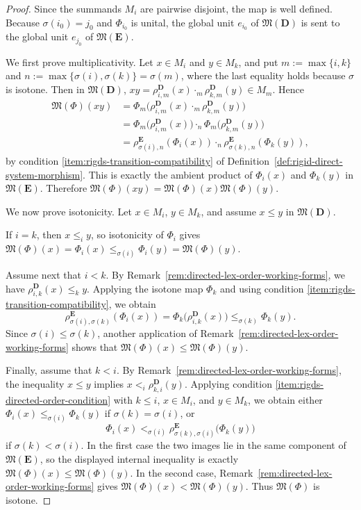 \documentclass[pdflatex,sn-mathphys-num]{sn-jnl}
\theoremstyle{thmstyleone}%
\theoremstyle{thmstyletwo}%
\theoremstyle{thmstylethree}%
\begin{document}
\begin{proof}
Since the summands \(M_i\) are pairwise disjoint, the map is well defined.
Because \(\sigma(i_0)=j_0\) and \(\Phi_{i_0}\) is unital, the global unit \(e_{i_0}\) of \(\mathfrak M(\mathbf D)\) is sent to the global unit \(e_{j_0}\) of \(\mathfrak M(\mathbf E)\).

We first prove multiplicativity.
Let \(x\in M_i\) and \(y\in M_k\), and put \(m:=\max\{i,k\}\) and \(n:=\max\{\sigma(i),\sigma(k)\}=\sigma(m)\), where the last equality holds because \(\sigma\) is isotone.
Then in \(\mathfrak M(\mathbf D)\), \(xy=\rho^{\mathbf D}_{i,m}(x)\cdot_m \rho^{\mathbf D}_{k,m}(y)\in M_m\).
Hence
\begin{align*}
\mathfrak M(\Phi)(xy)
&=\Phi_m\bigl(\rho^{\mathbf D}_{i,m}(x)\cdot_m
\rho^{\mathbf D}_{k,m}(y)\bigr)\\
&=\Phi_m\bigl(\rho^{\mathbf D}_{i,m}(x)\bigr)\cdot_n
\Phi_m\bigl(\rho^{\mathbf D}_{k,m}(y)\bigr)\\
&=\rho^{\mathbf E}_{\sigma(i),n}(\Phi_i(x))\cdot_n
\rho^{\mathbf E}_{\sigma(k),n}(\Phi_k(y)),
\end{align*}
by condition \ref{item:rigds-transition-compatibility} of Definition~\ref{def:rigid-direct-system-morphism}.
This is exactly the ambient product of \(\Phi_i(x)\) and \(\Phi_k(y)\) in \(\mathfrak M(\mathbf E)\).
Therefore \(\mathfrak M(\Phi)(xy)=\mathfrak M(\Phi)(x)\mathfrak M(\Phi)(y)\).

We now prove isotonicity.
Let \(x\in M_i\), \(y\in M_k\), and assume \(x\le y\) in \(\mathfrak M(\mathbf D)\).

If \(i=k\), then \(x\le_i y\), so isotonicity of \(\Phi_i\) gives \(\mathfrak M(\Phi)(x)=\Phi_i(x)\le_{\sigma(i)} \Phi_i(y)=\mathfrak M(\Phi)(y)\).

Assume next that \(i<k\).
By Remark~\ref{rem:directed-lex-order-working-forms}, we have \(\rho^{\mathbf D}_{i,k}(x)\le_k y\).
Applying the isotone map \(\Phi_k\) and using condition \ref{item:rigds-transition-compatibility}, we obtain
\[
\rho^{\mathbf E}_{\sigma(i),\sigma(k)}(\Phi_i(x))
=
\Phi_k\bigl(\rho^{\mathbf D}_{i,k}(x)\bigr)
\le_{\sigma(k)}
\Phi_k(y).
\]
Since \(\sigma(i)\le \sigma(k)\), another application of Remark~\ref{rem:directed-lex-order-working-forms} shows that \(\mathfrak M(\Phi)(x)\le \mathfrak M(\Phi)(y)\).

Finally, assume that \(k<i\).
By Remark~\ref{rem:directed-lex-order-working-forms}, the inequality \(x\le y\) implies \(x<_i \rho^{\mathbf D}_{k,i}(y)\).
Applying condition \ref{item:rigds-directed-order-condition} with \(k\le i\), \(x\in M_i\), and \(y\in M_k\), we obtain either \(\Phi_i(x)\le_{\sigma(i)}\Phi_k(y)\) if \(\sigma(k)=\sigma(i)\), or
\[
\Phi_i(x)<_{\sigma(i)}
\rho^{\mathbf E}_{\sigma(k),\sigma(i)}\!\bigl(\Phi_k(y)\bigr)
\]
if \(\sigma(k)<\sigma(i)\).
In the first case the two images lie in the same component of \(\mathfrak M(\mathbf E)\), so the displayed internal inequality is exactly \(\mathfrak M(\Phi)(x)\le \mathfrak M(\Phi)(y)\).
In the second case, Remark~\ref{rem:directed-lex-order-working-forms} gives \(\mathfrak M(\Phi)(x)<\mathfrak M(\Phi)(y)\).
Thus \(\mathfrak M(\Phi)\) is isotone.


\end{proof}
\end{document}
